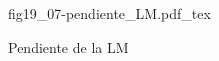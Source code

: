 \begin{figure}[h]
\centering
\def\svgwidth{0.5\textwidth}
{fig19_07-pendiente_LM.pdf_tex}
\caption{Pendiente de la LM}
\label{fig19_07-pendiente_LM}
\end{figure}
